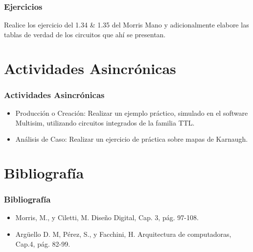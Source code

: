 \documentclass[11pt]{beamer}
\begin{document}
\begin{frame}
\frametitle{Ejercicios}
Realice los ejercicio del 1.34 \& 1.35 del Morris Mano y adicionalmente elabore las tablas de verdad de los circuitos que ah\'i se presentan.
\end{frame}

\section{Actividades Asincr\'onicas}
\begin{frame}
\frametitle{Actividades Asincr\'onicas}
	\begin{itemize}
		\item Producci\'on o Creaci\'on: Realizar un ejemplo pr\'actico, simulado en el software Multisim, utilizando circuitos integrados de la familia TTL.
		\item An\'alisis de Caso: Realizar un ejercicio de pr\'actica sobre mapas de Karnaugh.
		\end{itemize}
\end{frame}

\section{Bibliograf\'ia}
\begin{frame}
	\frametitle{Bibliograf\'ia}
	\begin{itemize}
		\item Morris, M., y Ciletti, M. Diseño Digital, Cap. 3, pág. 97-108.
		\item Argüello D. M, Pérez, S., y Facchini, H. Arquitectura de computadoras, Cap.4, pág. 82-99.
		\end{itemize}
\end{frame}
\end{document}

